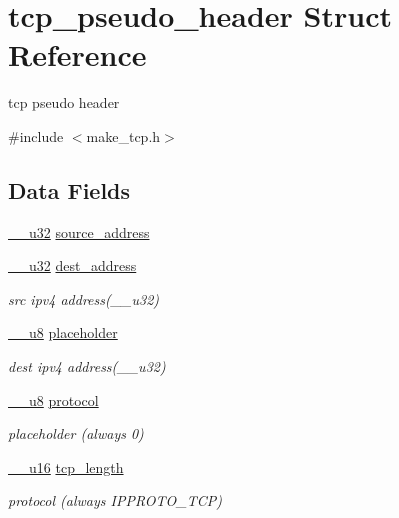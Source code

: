 \hypertarget{structtcp__pseudo__header}{}\section{tcp\+\_\+pseudo\+\_\+header Struct Reference}
\label{structtcp__pseudo__header}


tcp pseudo header  




{\ttfamily \#include $<$make\+\_\+tcp.\+h$>$}

\subsection*{Data Fields}
\begin{DoxyCompactItemize}
\item 
\hyperlink{asm__types_8h_a3acae9310e2c2e411e800a8a369171c6}{\+\_\+\+\_\+u32} \hyperlink{structtcp__pseudo__header_ae43692ff239e4d41b3109cead61f2961}{source\+\_\+address}
\item 
\hyperlink{asm__types_8h_a3acae9310e2c2e411e800a8a369171c6}{\+\_\+\+\_\+u32} \hyperlink{structtcp__pseudo__header_ad1dfa6f7871245086b831aa281f958d5}{dest\+\_\+address}
\begin{DoxyCompactList}\small\item\em src ipv4 address(\+\_\+\+\_\+u32) \end{DoxyCompactList}\item 
\hyperlink{asm__types_8h_a77f8102529baef48621b98012524115d}{\+\_\+\+\_\+u8} \hyperlink{structtcp__pseudo__header_ae4b2c60e0c518e7aec8d55eca6de4d4c}{placeholder}
\begin{DoxyCompactList}\small\item\em dest ipv4 address(\+\_\+\+\_\+u32) \end{DoxyCompactList}\item 
\hyperlink{asm__types_8h_a77f8102529baef48621b98012524115d}{\+\_\+\+\_\+u8} \hyperlink{structtcp__pseudo__header_a56a37c755bcacb62a730e595c482fd27}{protocol}
\begin{DoxyCompactList}\small\item\em placeholder (always 0) \end{DoxyCompactList}\item 
\hyperlink{asm__types_8h_abc70358187152575fd05fbf6d253151f}{\+\_\+\+\_\+u16} \hyperlink{structtcp__pseudo__header_a21a0a4cdb18a854d72e4d45339e8623e}{tcp\+\_\+length}
\begin{DoxyCompactList}\small\item\em protocol (always I\+P\+P\+R\+O\+T\+O\+\_\+\+T\+CP) \end{DoxyCompactList}\end{DoxyCompactItemize}


